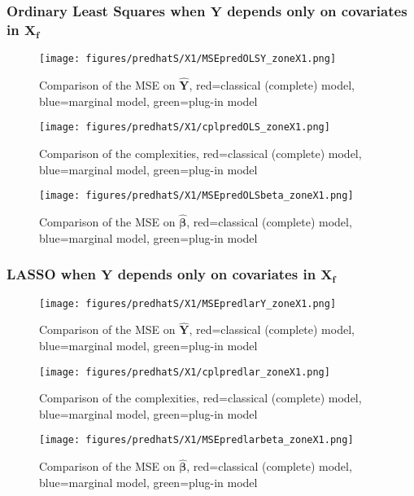 \documentclass[12pt,a4paper]{report}
\begin{document}
\clearpage




\newpage
\subsubsection{Ordinary Least Squares when $\boldsymbol{Y}$ depends only on covariates in $\boldsymbol{X_f}$}

	\begin{figure}[h!]
	\centering
		  \texttt{[image: figures/predhatS/X1/MSEpredOLSY\_zoneX1.png]}
		\caption{Comparison of the MSE on $\hat{\boldsymbol{Y}}$, red=classical (complete) model, blue=marginal model, green=plug-in model}\label{MSEpredOLSY_zoneX1}
	\end{figure}
	\begin{figure}[h!]
	\centering
		  \texttt{[image: figures/predhatS/X1/cplpredOLS\_zoneX1.png]}
		\caption{Comparison of the complexities, red=classical (complete) model, blue=marginal model, green=plug-in model}\label{cplpredOLS_zoneX1}
	\end{figure}
	\begin{figure}[h!]
	\centering
		  \texttt{[image: figures/predhatS/X1/MSEpredOLSbeta\_zoneX1.png]}
		\caption{Comparison of the MSE on $\hat{\boldsymbol{\beta}}$, red=classical (complete) model, blue=marginal model, green=plug-in model}\label{MSEpredOLSbeta_zoneX1}
	\end{figure}
	\FloatBarrier
\newpage
\subsubsection{LASSO when $\boldsymbol{Y}$ depends only on covariates in $\boldsymbol{X_f}$}

	\begin{figure}[h!]
	\centering
		  \texttt{[image: figures/predhatS/X1/MSEpredlarY\_zoneX1.png]}
		\caption{Comparison of the MSE on $\hat{\boldsymbol{Y}}$, red=classical (complete) model, blue=marginal model, green=plug-in model}\label{MSEpredlarY_zoneX1}
	\end{figure}
	\begin{figure}[h!]
	\centering
		  \texttt{[image: figures/predhatS/X1/cplpredlar\_zoneX1.png]}
		\caption{Comparison of the complexities, red=classical (complete) model, blue=marginal model, green=plug-in model}\label{cplpredlar_zoneX1}
	\end{figure}
	\begin{figure}[h!]
	\centering
		  \texttt{[image: figures/predhatS/X1/MSEpredlarbeta\_zoneX1.png]}
		\caption{Comparison of the MSE on $\hat{\boldsymbol{\beta}}$, red=classical (complete) model, blue=marginal model, green=plug-in model}\label{MSEpredlarbeta_zoneX1}
	\end{figure}
	\FloatBarrier
\newpage
\end{document}
